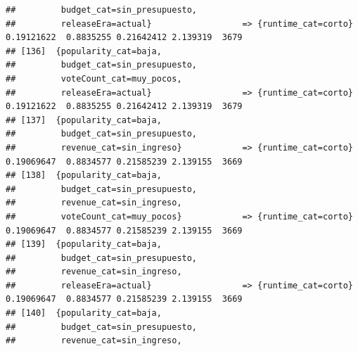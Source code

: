\documentclass[
]{article}
\begin{document}
\begin{verbatim}
##         budget_cat=sin_presupuesto,                                                                                             
##         releaseEra=actual}                  => {runtime_cat=corto}               0.19121622  0.8835255 0.21642412 2.139319  3679
## [136]  {popularity_cat=baja,                                                                                                    
##         budget_cat=sin_presupuesto,                                                                                             
##         voteCount_cat=muy_pocos,                                                                                                
##         releaseEra=actual}                  => {runtime_cat=corto}               0.19121622  0.8835255 0.21642412 2.139319  3679
## [137]  {popularity_cat=baja,                                                                                                    
##         budget_cat=sin_presupuesto,                                                                                             
##         revenue_cat=sin_ingreso}            => {runtime_cat=corto}               0.19069647  0.8834577 0.21585239 2.139155  3669
## [138]  {popularity_cat=baja,                                                                                                    
##         budget_cat=sin_presupuesto,                                                                                             
##         revenue_cat=sin_ingreso,                                                                                                
##         voteCount_cat=muy_pocos}            => {runtime_cat=corto}               0.19069647  0.8834577 0.21585239 2.139155  3669
## [139]  {popularity_cat=baja,                                                                                                    
##         budget_cat=sin_presupuesto,                                                                                             
##         revenue_cat=sin_ingreso,                                                                                                
##         releaseEra=actual}                  => {runtime_cat=corto}               0.19069647  0.8834577 0.21585239 2.139155  3669
## [140]  {popularity_cat=baja,                                                                                                    
##         budget_cat=sin_presupuesto,                                                                                             
##         revenue_cat=sin_ingreso,                                                                                                

\end{verbatim}
\end{document}
